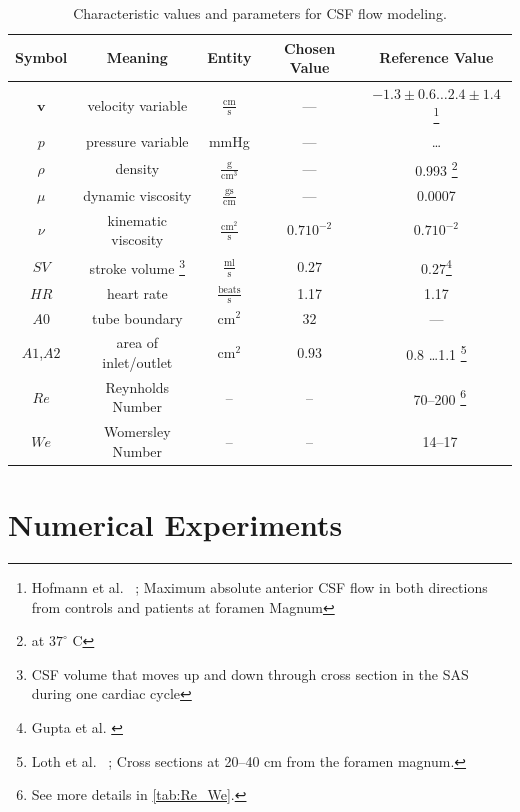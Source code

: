 \begin{table}\begin{minipage}{\textwidth}\begin{center}
    \begin{tabular}{ | c | c | c | c | c | }
    \hline
    Symbol & Meaning & Entity & Chosen Value & Reference Value\\ \hline\hline
	$\mathbf{v}$	& velocity variable & $\mathrm{ \frac{cm}{s}}$ & --- & $-1.3\pm 0.6 \ldots 2.4 \pm 1.4$ \footnote{Hofmann et al. ~\cite{Hofmann2000}; Maximum absolute anterior CSF flow in both directions from controls and patients at foramen Magnum} \\ 
	$p$		& pressure	variable & mmHg & --- & \ldots\\
	$\rho$	& density & $\mathrm{\frac{g}{cm^3}}$ & --- &0.993 \footnote{at $37^\circ$ C }\\ %
	$\mu$	& dynamic viscosity	&  $\mathrm{\frac{g s}{cm}}$ & --- & 0.0007\\
	$\nu$	& kinematic viscosity & $\mathrm{ \frac{cm^2}{s}}$ & $0.7 10^{-2}$ & $0.7 10^{-2}$ \\ 	\hline %
	$SV$	& stroke volume \footnote{CSF volume that moves up and down through cross section in the SAS during one cardiac cycle}	& $\mathrm{ \frac{ml}{s}}$& $0.27$  & $0.27$\footnote{Gupta et al. \cite{Gupta2009}} \\
	$HR$	& heart rate & $\mathrm{\frac{beats}{s}}$	& 1.17 & 1.17\\
	$A0$	& tube boundary	& $\mathrm{ cm^2}$ & $32$  & ---\\
	$A1$,$A2$	& area of inlet/outlet & $\mathrm{ cm^2}$ &$0.93$ & 0.8 \ldots 1.1 \footnote{Loth et al. ~\cite{Loth2001}; Cross sections at 20--40 cm from the foramen magnum.}  \\
    \hline
    $Re$    & Reynholds Number & -- & -- & ~70--200 \footnote{See more details in \ref{tab:Re_We}.}\\
    $We$    & Womersley Number & -- & -- & ~14--17 \\
    \hline
    \end{tabular}
	\label{tab:entities}
	\caption{Characteristic values and parameters for CSF flow modeling.}
\end{center}\end{minipage}\end{table}

\section{Numerical Experiments} 

